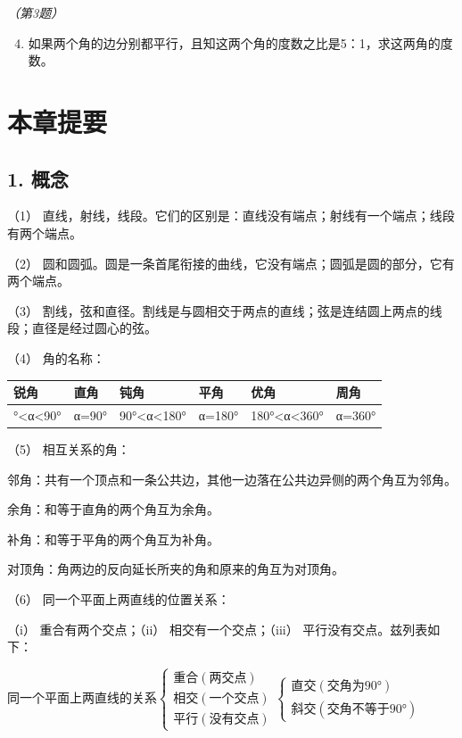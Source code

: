 \emph{（第3题）}

\begin{enumerate}
\setcounter{enumi}{3}
\item
  如果两个角的边分别都平行，且知这两个角的度数之比是5：1，求这两角的度数。
\end{enumerate}

\section{本章提要}

\subsection{1. 概念}

（1）
直线，射线，线段。它们的区别是：直线没有端点；射线有一个端点；线段有两个端点。

（2）
圆和圆弧。圆是一条首尾衔接的曲线，它没有端点；圆弧是圆的部分，它有两个端点。

（3）
割线，弦和直径。割线是与圆相交于两点的直线；弦是连结圆上两点的线段；直径是经过圆心的弦。

（4） 角的名称：

{\def\LTcaptype{none} %
\begin{longtable}[]{@{}llllll@{}}
\toprule\noalign{}
锐角 & 直角 & 钝角 & 平角 & 优角 & 周角 \\
\midrule\noalign{}
\endhead
\bottomrule\noalign{}
\endlastfoot
0°\textless α\textless90° & α=90° & 90°\textless α\textless180° & α=180°
& 180°\textless α\textless360° & α=360° \\
\end{longtable}
}

（5） 相互关系的角：

邻角：共有一个顶点和一条公共边，其他一边落在公共边异侧的两个角互为邻角。

余角：和等于直角的两个角互为余角。

补角：和等于平角的两个角互为补角。

对顶角：角两边的反向延长所夹的角和原来的角互为对顶角。

（6） 同一个平面上两直线的位置关系：

（i） 重合有两个交点；（ii） 相交有一个交点；（iii）
平行没有交点。兹列表如下：

同一个平面上两直线的关系\(\left\{\begin{array}{l} \text{重合}(\text{两交点}) \\ \text{相交}(\text{一个交点}) \\ \text{平行}(\text{没有交点}) \end{array}\right.\)\(\left\{\begin{array}{l} \text{直交}(\text{交角为}90°) \\ \text{斜交}(\text{交角不等于}90°) \end{array}\right.\)

